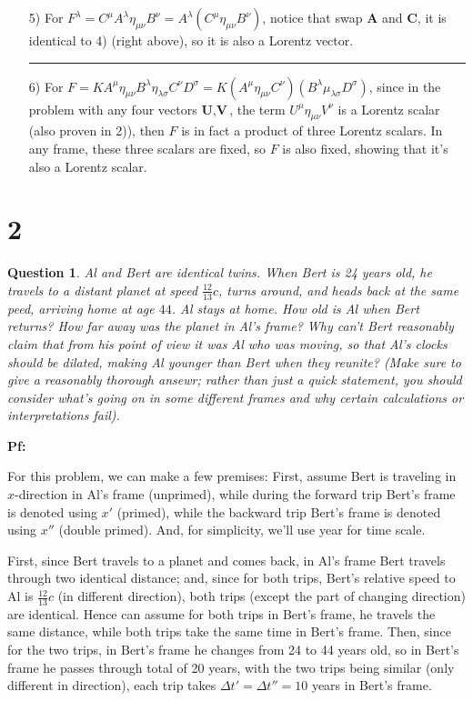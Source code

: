 \documentclass{article}
\newtheorem{question}{Question}
\begin{document}
\begin{itemize}
    \rule{15.6cm}{0,1mm}

    \item[5)] For $F^\lambda = C^\mu A^\lambda \eta_{\mu\nu}B^\nu = A^\lambda(C^\mu\eta_{\mu\nu}B^\nu)$, notice that swap $\textbf{A}$ and $\textbf{C}$, it is identical to 4) (right above), so it is also a Lorentz vector.
    
    \rule{15.6cm}{0,1mm}

    \item[6)] For $F=KA^\mu \eta_{\mu\nu}B^\lambda \eta_{\lambda\sigma}C^\nu D^\sigma = K(A^\mu\eta_{\mu\nu}C^\nu)(B^\lambda\mu_{\lambda\sigma}D^\sigma)$, since in the problem with any four vectors $\textbf{U},\textbf{V}$, the term $U^\mu\eta_{\mu\nu}V^\nu$ is a Lorentz scalar (also proven in 2)), then $F$ is in fact a product of three Lorentz scalars. In any frame, these three scalars are fixed, so $F$ is also fixed, showing that it's also a Lorentz scalar.
\end{itemize}

\break

\section*{2}
\begin{question}\label{q2}
    Al and Bert are identical twins. When Bert is 24 years old, he travels to a distant planet at speed $\frac{12}{13}c$, turns around, and heads back at the same peed, arriving home at age $44$. Al stays at home. How old is Al when Bert returns? How far away was the planet in Al's frame? Why can't Bert reasonably claim that from his point of view it was Al who was moving, so that Al's clocks should be dilated, making Al younger than Bert when they reunite? (Make sure to give a reasonably thorough ansewr; rather than just a quick statement, you should consider what's going on in some different frames and why certain calculations or interpretations fail).
\end{question}

\textbf{Pf:}

For this problem, we can make a few premises: First, assume Bert is traveling in $x$-direction in Al's frame (unprimed), while during the forward trip Bert's frame is denoted using $x'$ (primed), while the backward trip Bert's frame is denoted using $x''$ (double primed). And, for simplicity, we'll use year for time scale.

\hfil

First, since Bert travels to a planet and comes back, in Al's frame Bert travels through two identical distance; and, since for both trips, Bert's relative speed to Al is $\frac{12}{13}c$ (in different direction), both trips (except the part of changing direction) are identical. Hence can assume for both trips in Bert's frame, he travels the same distance, while both trips take the same time in Bert's frame. Then, since for the two trips, in Bert's frame he changes from 24 to 44 years old, so in Bert's frame he passes through total of 20 years, with the two trips being similar (only different in direction), each trip takes $\Delta t'=\Delta t'' = 10$ years in Bert's frame. 
\end{document}
